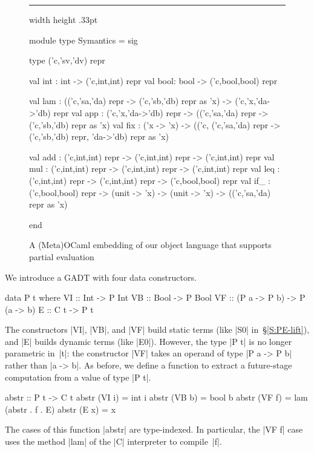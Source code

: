 \documentclass[preprint]{sigplanconf}
\newenvironment{floatrule}
    {\hrule width \hsize height .33pt \vspace{.5pc}}
    {\par\addvspace{1ex}}
\begin{document}
\begin{figure*}
\begin{floatrule}
\begin{code}
module type Symantics = sig

  type ('c,'sv,'dv) repr

  val int : int  -> ('c,int,int) repr
  val bool: bool -> ('c,bool,bool) repr

  val lam : (('c,'sa,'da) repr -> ('c,'sb,'db) repr as 'x) -> ('c,'x,'da->'db) repr
  val app : ('c,'x,'da->'db) repr -> (('c,'sa,'da) repr -> ('c,'sb,'db) repr as 'x)
  val fix : ('x -> 'x) -> (('c, ('c,'sa,'da) repr -> ('c,'sb,'db) repr, 'da->'db) repr as 'x)

  val add : ('c,int,int) repr -> ('c,int,int) repr -> ('c,int,int) repr
  val mul : ('c,int,int) repr -> ('c,int,int) repr -> ('c,int,int) repr
  val leq : ('c,int,int) repr -> ('c,int,int) repr -> ('c,bool,bool) repr
  val if_ : ('c,bool,bool) repr -> (unit -> 'x) -> (unit -> 'x) -> (('c,'sa,'da) repr as 'x)

end
\end{code}
\end{floatrule}
\caption{A (Meta)OCaml embedding of our object language that supports partial evaluation}
\label{fig:ocaml}
\end{figure*}

We introduce a GADT with four data constructors.
\begin{code}
data P t where
  VI :: Int  -> P Int
  VB :: Bool -> P Bool
  VF :: (P a -> P b) -> P (a -> b)
  E  :: C t -> P t
\end{code}
The constructors |VI|, |VB|, and |VF| build static terms (like |S0|
in~\S\ref{S:PE-lift}), and |E| builds dynamic terms (like |E0|).  However,
the type |P t| is no longer parametric in~|t|: the constructor |VF| takes an
operand of type |P a -> P b| rather than |a -> b|. As before, we define a
function to extract a future-stage computation from a value of type |P t|.
\begin{code}
abstr :: P t -> C t
abstr (VI i) = int i
abstr (VB b) = bool b
abstr (VF f) = lam (abstr . f . E)
abstr (E x)  = x
\end{code}
The cases of this function |abstr| are type-indexed.  In particular, the |VF f|
case uses the method |lam| of the |C| interpreter to compile~|f|.
\end{document}
